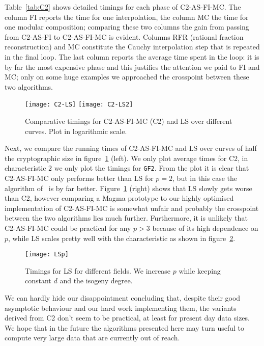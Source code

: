 Table~\ref{tab:C2} shows detailed timings for each phase of
C2-AS-FI-MC. The column FI reports the time for one interpolation, the
column MC the time for one modular composition; comparing these two
columns the gain from passing from C2-AS-FI to C2-AS-FI-MC is
evident. Columns RFR (rational fraction reconstruction) and MC
constitute the Cauchy interpolation step that is repeated in the final
loop. The last column reports the average time spent in the loop: it
is by far the most expensive phase and this justifies the attention we
paid to FI and MC; only on some huge examples we approached the
crosspoint between these two algorithms.

\begin{figure}
  \centering
  \texttt{[image: C2-LS]}
   \texttt{[image: C2-LS2]}
   \caption{Comparative timings for C2-AS-FI-MC (C2) and LS over
     different curves. Plot in logarithmic scale.}
  \label{fig:comp}
\end{figure}

Next, we compare the running times of C2-AS-FI-MC and LS over curves
of half the cryptographic size in figure~\ref{fig:comp} (left). We
only plot average times for C2, in characteristic $2$ we only plot the
timings for \texttt{GF2}. From the plot it is clear that C2-AS-FI-MC
only performs better than LS for $p=2$, but in this case the algorithm
of~\cite{Ler96} is by far better.  Figure~\ref{fig:comp} (right) shows
that LS slowly gets worse than C2, however comparing a Magma prototype
to our highly optimised implementation of C2-AS-FI-MC is somewhat
unfair and probably the crosspoint between the two algorithms lies
much further. Furthermore, it is unlikely that C2-AS-FI-MC could be
practical for any $p>3$ because of its high dependence on $p$, while
LS scales pretty well with the characteristic as shown in
figure~\ref{fig:LSp}.

\begin{figure}
  \centering
  \texttt{[image: LSp]}
  \caption{Timings for LS for different fields. We increase $p$ while
    keeping constant $d$ and the isogeny degree.}
  \label{fig:LSp}
\end{figure}

We can hardly hide our disappointment concluding that, despite their
good asymptotic behaviour and our hard work implementing them, the
variants derived from C2 don't seem to be practical, at least for
present day data sizes. We hope that in the future the algorithms
presented here may turn useful to compute very large data that are
currently out of reach.




%
